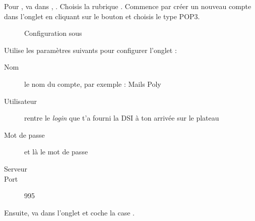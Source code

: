 Pour , va dans , . Choisis la
rubrique . Commence par cr\'eer un nouveau compte dans
l'onglet  en cliquant sur le bouton
 et choisis le type POP3.


\noindent
  \begin{figure}[!h]
    \begin{center}  
         	 \caption{Configuration sous }
    \end{center}
  \end{figure}


Utilise les param\`etres suivants pour configurer l'onglet  :
\begin{description}
  \item[Nom] le nom du compte, par exemple : Mails Poly
  \item[Utilisateur] rentre le \emph{login}  que t'a fourni la DSI \`a  ton arriv\'ee sur le plateau
  \item[Mot de passe] et l\`a  le mot de passe 
  \item[Serveur] 
  \item[Port] 995
\end{description}
Ensuite, va dans l'onglet  et coche la case
.

